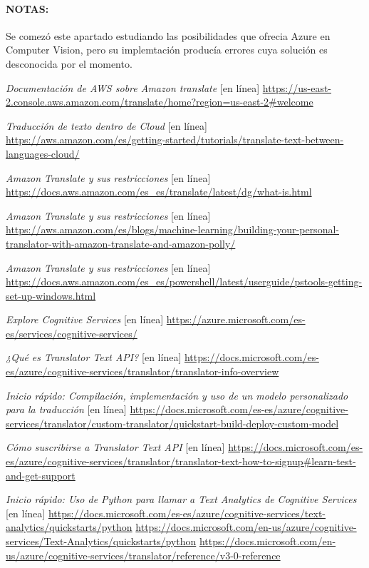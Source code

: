 \documentclass[runningheads]{llncs}
\begin{document}
\paragraph{NOTAS:} Se comezó este apartado estudiando las posibilidades que ofrecia Azure en Computer Vision, pero su implemtación producía errores cuya solución es desconocida por el momento.

\begin{thebibliography}{8}


\textit{Documentación de AWS sobre Amazon translate} [en línea] \url{https://us-east-2.console.aws.amazon.com/translate/home?region=us-east-2#welcome}

\textit{Traducción de texto dentro de Cloud} [en línea] \url{https://aws.amazon.com/es/getting-started/tutorials/translate-text-between-languages-cloud/}

\textit{Amazon Translate y sus restricciones} [en línea] \url{https://docs.aws.amazon.com/es_es/translate/latest/dg/what-is.html}

\textit{Amazon Translate y sus restricciones} [en línea] \url{https://aws.amazon.com/es/blogs/machine-learning/building-your-personal-translator-with-amazon-translate-and-amazon-polly/}

\textit{Amazon Translate y sus restricciones} [en línea] \url{https://docs.aws.amazon.com/es_es/powershell/latest/userguide/pstools-getting-set-up-windows.html}

\textit{Explore Cognitive Services} [en línea] \url{https://azure.microsoft.com/es-es/services/cognitive-services/}

\textit{¿Qué es Translator Text API?} [en línea] \url{https://docs.microsoft.com/es-es/azure/cognitive-services/translator/translator-info-overview}

\textit{Inicio rápido: Compilación, implementación y uso de un modelo personalizado para la traducción} [en línea] \url{https://docs.microsoft.com/es-es/azure/cognitive-services/translator/custom-translator/quickstart-build-deploy-custom-model}

\textit{Cómo suscribirse a Translator Text API} [en línea] \url{https://docs.microsoft.com/es-es/azure/cognitive-services/translator/translator-text-how-to-signup#learn-test-and-get-support}

\textit{Inicio rápido: Uso de Python para llamar a Text Analytics de Cognitive Services} [en línea] \url{https://docs.microsoft.com/es-es/azure/cognitive-services/text-analytics/quickstarts/python}
\url{https://docs.microsoft.com/en-us/azure/cognitive-services/Text-Analytics/quickstarts/python}
\url{https://docs.microsoft.com/en-us/azure/cognitive-services/translator/reference/v3-0-reference}

\end{thebibliography}
\end{document}
